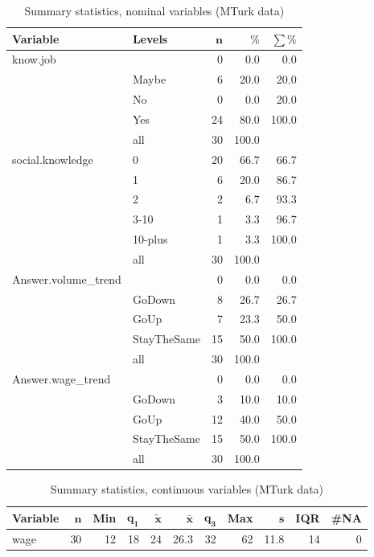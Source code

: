 \documentclass[a4paper,10pt]{article}\usepackage[]{graphicx}\usepackage[]{color}
\begin{document}
\begin{table}[ht]
\centering
{\footnotesize
\begin{tabular}{ll|rrr}
 \textbf{Variable} & \textbf{Levels} & $\mathbf{n}$ & $\mathbf{\%}$ & $\mathbf{\sum \%}$ \\ 
  \hline
know.job &  & 0 & 0.0 & 0.0 \\ 
   & Maybe & 6 & 20.0 & 20.0 \\ 
   & No & 0 & 0.0 & 20.0 \\ 
   & Yes & 24 & 80.0 & 100.0 \\ 
   \hline
 & all & 30 & 100.0 &  \\ 
   \hline
\hline
social.knowledge & 0 & 20 & 66.7 & 66.7 \\ 
   & 1 & 6 & 20.0 & 86.7 \\ 
   & 2 & 2 & 6.7 & 93.3 \\ 
   & 3-10 & 1 & 3.3 & 96.7 \\ 
   & 10-plus & 1 & 3.3 & 100.0 \\ 
   \hline
 & all & 30 & 100.0 &  \\ 
   \hline
\hline
Answer.volume\_trend &  & 0 & 0.0 & 0.0 \\ 
   & GoDown & 8 & 26.7 & 26.7 \\ 
   & GoUp & 7 & 23.3 & 50.0 \\ 
   & StayTheSame & 15 & 50.0 & 100.0 \\ 
   \hline
 & all & 30 & 100.0 &  \\ 
   \hline
\hline
Answer.wage\_trend &  & 0 & 0.0 & 0.0 \\ 
   & GoDown & 3 & 10.0 & 10.0 \\ 
   & GoUp & 12 & 40.0 & 50.0 \\ 
   & StayTheSame & 15 & 50.0 & 100.0 \\ 
   \hline
 & all & 30 & 100.0 &  \\ 
   \hline
\hline
\end{tabular}
}
\caption{Summary statistics, nominal variables (MTurk data)} 
\label{tab1:11-9030}
\end{table}
\begin{table}[ht]
\centering
{\footnotesize
\begin{tabular}{lrrrrrrrrrr}
 \textbf{Variable} & $\mathbf{n}$ & \textbf{Min} & $\mathbf{q_1}$ & $\mathbf{\widetilde{x}}$ & $\mathbf{\bar{x}}$ & $\mathbf{q_3}$ & \textbf{Max} & $\mathbf{s}$ & \textbf{IQR} & \textbf{\#NA} \\ 
  \hline
wage & 30 & 12 & 18 & 24 & 26.3 & 32 & 62 & 11.8 & 14 & 0 \\ 
  \end{tabular}
}
\caption{Summary statistics, continuous variables (MTurk data)} 
\label{tab2:11-9030}
\end{table}
\end{document}

